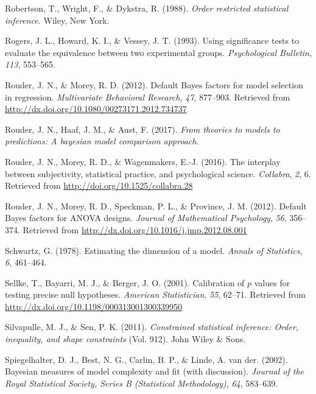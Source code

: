 \documentclass[english,man]{apa6}
\theoremstyle{definition}
\theoremstyle{definition}
\theoremstyle{remark}
\begin{document}
\hypertarget{ref-Robertson:etal:1988}{}
Robertson, T., Wright, F., \& Dykstra, R. (1988). \emph{Order restricted
statistical inference.} Wiley, New York.

\hypertarget{ref-Rogers:etal:1993}{}
Rogers, J. L., Howard, K. I., \& Vessey, J. T. (1993). Using
significance tests to evaluate the equivalence between two experimental
groups. \emph{Psychological Bulletin}, \emph{113}, 553--565.

\hypertarget{ref-Rouder:Morey:2012}{}
Rouder, J. N., \& Morey, R. D. (2012). Default Bayes factors for model
selection in regression. \emph{Multivariate Behavioral Research},
\emph{47}, 877--903. Retrieved from
\url{http://dx.doi.org/10.1080/00273171.2012.734737}

\hypertarget{ref-Rouder:etal:2017}{}
Rouder, J. N., Haaf, J. M., \& Aust, F. (2017). \emph{From theories to
models to predictions: A bayesian model comparison approach}.

\hypertarget{ref-Rouder:etal:2016b}{}
Rouder, J. N., Morey, R. D., \& Wagenmakers, E.-J. (2016). The interplay
between subjectivity, statistical practice, and psychological science.
\emph{Collabra}, \emph{2}, 6. Retrieved from
\url{http://doi.org/10.1525/collabra.28}

\hypertarget{ref-Rouder:etal:2012}{}
Rouder, J. N., Morey, R. D., Speckman, P. L., \& Province, J. M. (2012).
Default Bayes factors for ANOVA designs. \emph{Journal of Mathematical
Psychology}, \emph{56}, 356--374. Retrieved from
\url{http://dx.doi.org/10.1016/j.jmp.2012.08.001}

\hypertarget{ref-Schwartz:1978}{}
Schwartz, G. (1978). Estimating the dimension of a model. \emph{Annals
of Statistics}, \emph{6}, 461--464.

\hypertarget{ref-Sellke:etal:2001}{}
Sellke, T., Bayarri, M. J., \& Berger, J. O. (2001). Calibration of
\(p\) values for testing precise null hypotheses. \emph{American
Statistician}, \emph{55}, 62--71. Retrieved from
\url{http://dx.doi.org/10.1198/000313001300339950}

\hypertarget{ref-Silvapulle:Sen:2011}{}
Silvapulle, M. J., \& Sen, P. K. (2011). \emph{Constrained statistical
inference: Order, inequality, and shape constraints} (Vol. 912). John
Wiley \& Sons.

\hypertarget{ref-Spiegelhalter:etal:2002}{}
Spiegelhalter, D. J., Best, N. G., Carlin, B. P., \& Linde, A. van der.
(2002). Bayesian measures of model complexity and fit (with discussion).
\emph{Journal of the Royal Statistical Society, Series B (Statistical
Methodology)}, \emph{64}, 583--639.
\end{document}
